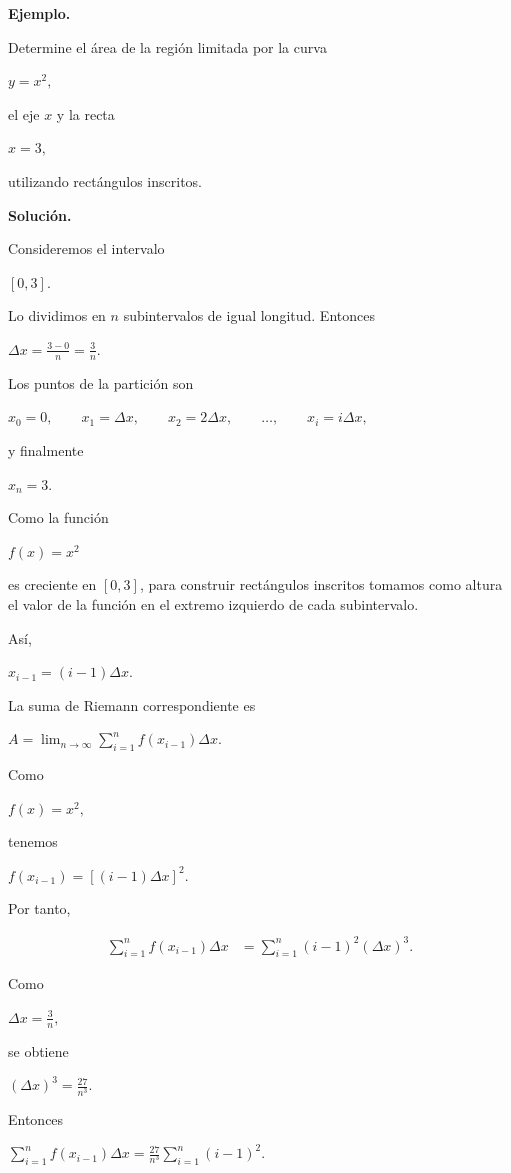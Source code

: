 \documentclass[12pt]{article}
\newenvironment{Ejem}
{\par\medskip\noindent\textbf{Ejemplo.}\ }
{\par\medskip}
\begin{document}
\begin{Ejem}

Determine el área de la región limitada por la curva

$
y=x^2,
$

el eje $x$ y la recta

$
x=3,
$

utilizando rectángulos inscritos.

\textbf{Solución.}

Consideremos el intervalo

$
[0,3].
$

Lo dividimos en $n$ subintervalos de igual longitud. Entonces

$
\Delta x
=
\frac{3-0}{n}
=
\frac{3}{n}.
$

Los puntos de la partición son

$
x_0=0,\qquad
x_1=\Delta x,\qquad
x_2=2\Delta x,\qquad
\ldots,\qquad
x_i=i\Delta x,
$

y finalmente

$
x_n=3.
$

Como la función

$
f(x)=x^2
$

es creciente en $[0,3]$, para construir rectángulos inscritos tomamos
como altura el valor de la función en el extremo izquierdo de cada
subintervalo.

Así,

$
x_{i-1}=(i-1)\Delta x.
$

La suma de Riemann correspondiente es

$
A
=
\lim_{n\to\infty}
\sum_{i=1}^{n}
f(x_{i-1})\Delta x.
$

Como

$
f(x)=x^2,
$

tenemos

$
f(x_{i-1})
=
\left[(i-1)\Delta x\right]^2.
$

Por tanto,

\begin{align*}
\sum_{i=1}^{n}
f(x_{i-1})\Delta x
&=
\sum_{i=1}^{n}
(i-1)^2(\Delta x)^3.
\end{align*}

Como

$
\Delta x=\frac{3}{n},
$

se obtiene

$
(\Delta x)^3
=
\frac{27}{n^3}.
$

Entonces

$
\sum_{i=1}^{n}
f(x_{i-1})\Delta x
=
\frac{27}{n^3}
\sum_{i=1}^{n}(i-1)^2.
$


\end{Ejem}
\end{document}
